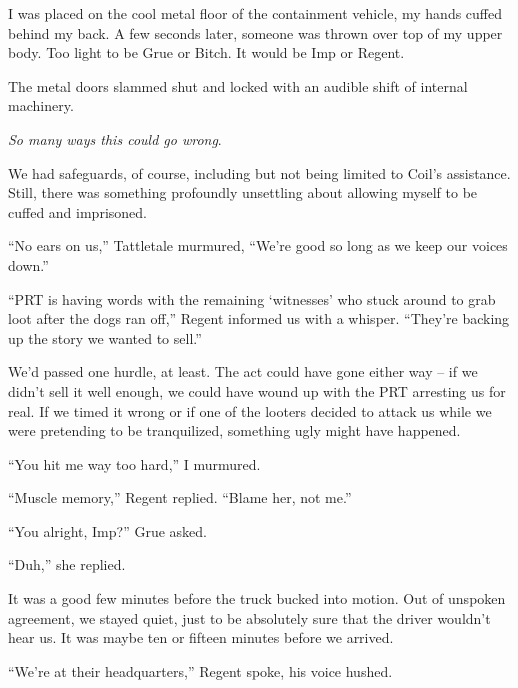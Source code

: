  I was placed on the cool metal floor of the containment vehicle, my hands cuffed behind my back.  A few seconds later, someone was thrown over top of my upper body.  Too light to be Grue or Bitch.  It would be Imp or Regent.



The metal doors slammed shut and locked with an audible shift of internal machinery.



\emph{So many ways this could go wrong}.



We had safeguards, of course, including but not being limited to Coil's assistance.  Still, there was something profoundly unsettling about allowing myself to be cuffed and imprisoned.



``No ears on us,'' Tattletale murmured, ``We're good so long as we keep our voices down.''



``PRT is having words with the remaining `witnesses' who stuck around to grab loot after the dogs ran off,'' Regent informed us with a whisper.  ``They're backing up the story we wanted to sell.''



We'd passed one hurdle, at least.  The act could have gone either way – if we didn't sell it well enough, we could have wound up with the PRT arresting us for real.  If we timed it wrong or if one of the looters decided to attack us while we were pretending to be tranquilized, something ugly might have happened.



``You hit me way too hard,'' I murmured.



``Muscle memory,'' Regent replied.  ``Blame her, not me.''



``You alright, Imp?'' Grue asked.



``Duh,'' she replied.



It was a good few minutes before the truck bucked into motion.  Out of unspoken agreement, we stayed quiet, just to be absolutely sure that the driver wouldn't hear us.  It was maybe ten or fifteen minutes before we arrived.



``We're at their headquarters,'' Regent spoke, his voice hushed.



